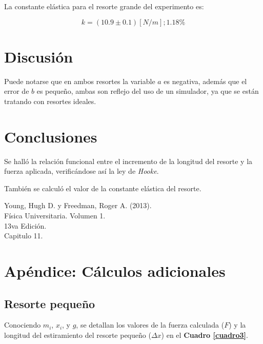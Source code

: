 \documentclass[letter,11pt]{article}
\begin{document}
La constante elástica para el resorte grande del experimento es:

\begin{equation*}
    k = (10.9 \pm 0.1) [N/m]; 1.18\%
\end{equation*}
\vspace{0.10cm}

\section{Discusión}

Puede notarse que en ambos resortes la variable $a$ es negativa, además que
el error de $b$ es pequeño, ambas son reflejo del uso de un simulador, ya que se
están tratando con resortes ideales.

\section{Conclusiones}

Se halló la relación funcional entre el incremento de la longitud del resorte y
la fuerza aplicada, verificándose así la ley de \emph{Hooke}.

También se calculó el valor de la constante elástica del resorte.

\begin{thebibliography}{99}

 Young, Hugh D. y Freedman, Roger A. (2013).\\
Física Universitaria. Volumen 1.\\
13va Edición.\\
Capitulo 11.

\end{thebibliography}

\newpage
\section*{Apéndice: Cálculos adicionales}

\subsection{Resorte pequeño}

Conociendo $m_i$, $x_i$, y $g$, se detallan los valores de la fuerza calculada
($F$) y la longitud del estiramiento del resorte pequeño ($\Delta x$) en el
\textbf{Cuadro \ref{cuadro3}}.
\end{document}
